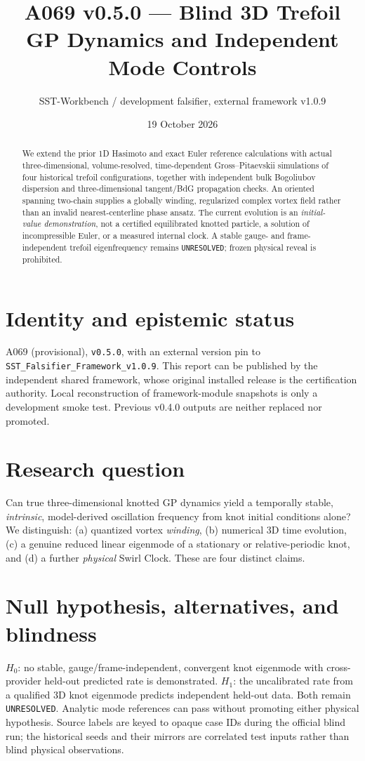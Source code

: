 \documentclass[10pt,a4paper]{article}
\title{A069 v0.5.0 --- Blind 3D Trefoil GP Dynamics and Independent Mode Controls}
\author{SST-Workbench / development falsifier, external framework v1.0.9}
\date{19 October 2026}
\begin{document}
\maketitle
\begin{abstract}
We extend the prior 1D Hasimoto and exact Euler reference calculations with actual three-dimensional, volume-resolved, time-dependent Gross--Pitaevskii simulations of four historical trefoil configurations, together with independent bulk Bogoliubov dispersion and three-dimensional tangent/BdG propagation checks. An oriented spanning two-chain supplies a globally winding, regularized complex vortex field rather than an invalid nearest-centerline phase ansatz. The current evolution is an \emph{initial-value demonstration}, not a certified equilibrated knotted particle, a solution of incompressible Euler, or a measured internal clock. A stable gauge- and frame-independent trefoil eigenfrequency remains \texttt{UNRESOLVED}; frozen physical reveal is prohibited.
\end{abstract}
\section{Identity and epistemic status}
A069 (provisional), \texttt{v0.5.0}, with an external version pin to \texttt{SST\_Falsifier\_Framework\_v1.0.9}. This report can be published by the independent shared framework, whose original installed release is the certification authority. Local reconstruction of framework-module snapshots is only a development smoke test. Previous v0.4.0 outputs are neither replaced nor promoted.
\section{Research question}
Can true three-dimensional knotted GP dynamics yield a temporally stable, \emph{intrinsic}, model-derived oscillation frequency from knot initial conditions alone? We distinguish: (a) quantized vortex \emph{winding}, (b) numerical 3D time evolution, (c) a genuine reduced linear eigenmode of a stationary or relative-periodic knot, and (d) a further \emph{physical} Swirl Clock. These are four distinct claims.
\section{Null hypothesis, alternatives, and blindness}
$H_0$: no stable, gauge/frame-independent, convergent knot eigenmode with cross-provider held-out predicted rate is demonstrated. $H_1$: the uncalibrated rate from a qualified 3D knot eigenmode predicts independent held-out data. Both remain \texttt{UNRESOLVED}. Analytic mode references can pass without promoting either physical hypothesis. Source labels are keyed to opaque case IDs during the official blind run; the historical seeds and their mirrors are correlated test inputs rather than blind physical observations.
\end{document}
